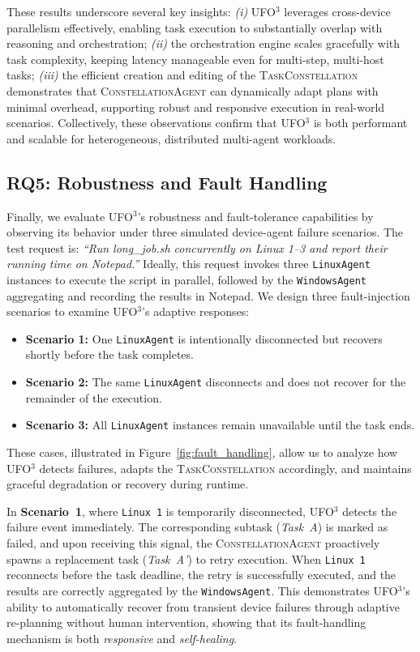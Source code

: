 \documentclass[10pt]{article} %
\newcommand{\ufo}{\textsc{UFO}$^3$\xspace}
\newcommand{\cagent}{\textsc{ConstellationAgent}\xspace}
\newcommand{\TaskConstellation}{\textsc{TaskConstellation}\xspace}
\begin{document}
These results underscore several key insights: \textit{(i)} \ufo leverages cross-device parallelism effectively, enabling task execution to substantially overlap with reasoning and orchestration; \textit{(ii)} the orchestration engine scales gracefully with task complexity, keeping latency manageable even for multi-step, multi-host tasks; \textit{(iii)} the efficient creation and editing of the \TaskConstellation demonstrates that \cagent can dynamically adapt plans with minimal overhead, supporting robust and responsive execution in real-world scenarios. Collectively, these observations confirm that \ufo is both performant and scalable for heterogeneous, distributed multi-agent workloads.


\subsection{RQ5: Robustness and Fault Handling}
\label{subsec:rq5}



Finally, we evaluate \ufo's robustness and fault-tolerance capabilities by observing its behavior under three simulated device-agent failure scenarios. The test request is: \textit{``Run long\_job.sh concurrently on Linux 1--3 and report their running time on Notepad.''} 
Ideally, this request invokes three \texttt{LinuxAgent} instances to execute the script in parallel, followed by the \texttt{WindowsAgent} aggregating and recording the results in Notepad. We design three fault-injection scenarios to examine \ufo's adaptive responses:
\begin{itemize}
    \item \textbf{Scenario 1:} One \texttt{LinuxAgent} is intentionally disconnected but recovers shortly before the task completes.
    \item \textbf{Scenario 2:} The same \texttt{LinuxAgent} disconnects and does not recover for the remainder of the execution.
    \item \textbf{Scenario 3:} All \texttt{LinuxAgent} instances remain unavailable until the task ends.
\end{itemize}
These cases, illustrated in Figure~\ref{fig:fault_handling}, allow us to analyze how \ufo detects failures, adapts the \TaskConstellation accordingly, and maintains graceful degradation or recovery during runtime.

In \textbf{Scenario~1}, where \texttt{Linux~1} is temporarily disconnected, \ufo detects the failure event immediately. The corresponding subtask (\textit{Task~A}) is marked as failed, and upon receiving this signal, the \cagent proactively spawns a replacement task (\textit{Task~A'}) to retry execution. When \texttt{Linux~1} reconnects before the task deadline, the retry is successfully executed, and the results are correctly aggregated by the \texttt{WindowsAgent}.  This demonstrates \ufo's ability to automatically recover from transient device failures through adaptive re-planning without human intervention, showing that its fault-handling mechanism is both \textit{responsive} and \textit{self-healing}.
\end{document}
